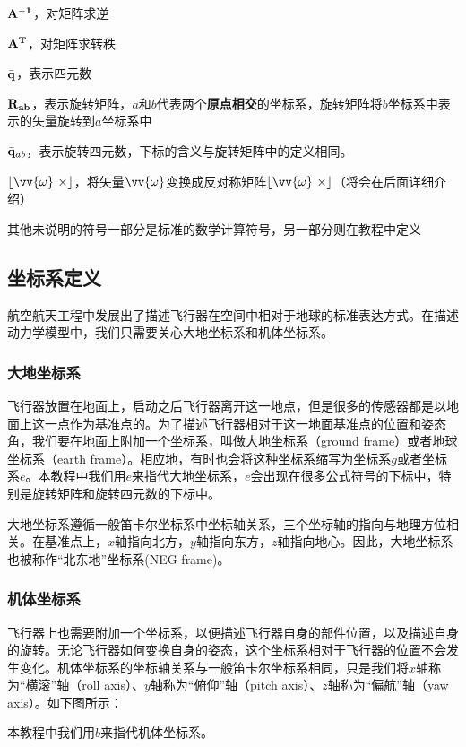 \documentclass[11pt]{article}
\begin{document}
$\bf{A}^{-1}$，对矩阵求逆

$\bf{A}^T$，对矩阵求转秩

$\bar{\bf{q}}$，表示四元数

$\bf{R}_{ab}$，表示旋转矩阵，$a$和$b$代表两个\textbf{原点相交}的坐标系，旋转矩阵将$b$坐标系中表示的矢量旋转到$a$坐标系中

$\bar{\bf{q}}_{ab}$，表示旋转四元数，下标的含义与旋转矩阵中的定义相同。

$\lfloor \vv{\omega} \ \times \rfloor$，将矢量$\vv{\omega}$变换成反对称矩阵$\lfloor \vv{\omega} \ \times \rfloor$（将会在后面详细介绍）

其他未说明的符号一部分是标准的数学计算符号，另一部分则在教程中定义
\subsection{坐标系定义}
航空航天工程中发展出了描述飞行器在空间中相对于地球的标准表达方式。在描述动力学模型中，我们只需要关心大地坐标系和机体坐标系。
\subsubsection{大地坐标系}
飞行器放置在地面上，启动之后飞行器离开这一地点，但是很多的传感器都是以地面上这一点作为基准点的。为了描述飞行器相对于这一地面基准点的位置和姿态角，我们要在地面上附加一个坐标系，叫做大地坐标系（ground frame）或者地球坐标系（earth frame）。相应地，有时也会将这种坐标系缩写为坐标系$g$或者坐标系$e$。本教程中我们用$e$来指代大地坐标系，$e$会出现在很多公式符号的下标中，特别是旋转矩阵和旋转四元数的下标中。

大地坐标系遵循一般笛卡尔坐标系中坐标轴关系，三个坐标轴的指向与地理方位相关。在基准点上，$x$轴指向北方，$y$轴指向东方，$z$轴指向地心。因此，大地坐标系也被称作“北东地”坐标系(NEG frame)。
\subsubsection{机体坐标系}\label{sec:bodyframe}
飞行器上也需要附加一个坐标系，以便描述飞行器自身的部件位置，以及描述自身的旋转。无论飞行器如何变换自身的姿态，这个坐标系相对于飞行器的位置不会发生变化。机体坐标系的坐标轴关系与一般笛卡尔坐标系相同，只是我们将$x$轴称为“横滚”轴（roll axis）、$y$轴称为“俯仰”轴（pitch axis）、$z$轴称为“偏航”轴（yaw axis）。如下图所示：

本教程中我们用$b$来指代机体坐标系。
\end{document}
